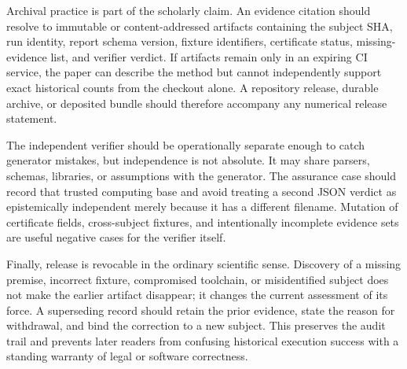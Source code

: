 Archival practice is part of the scholarly claim. An evidence citation should resolve to immutable or content-addressed artifacts containing the subject SHA, run identity, report schema version, fixture identifiers, certificate status, missing-evidence list, and verifier verdict. If artifacts remain only in an expiring CI service, the paper can describe the method but cannot independently support exact historical counts from the checkout alone. A repository release, durable archive, or deposited bundle should therefore accompany any numerical release statement.

The independent verifier should be operationally separate enough to catch generator mistakes, but independence is not absolute. It may share parsers, schemas, libraries, or assumptions with the generator. The assurance case should record that trusted computing base and avoid treating a second JSON verdict as epistemically independent merely because it has a different filename. Mutation of certificate fields, cross-subject fixtures, and intentionally incomplete evidence sets are useful negative cases for the verifier itself.

Finally, release is revocable in the ordinary scientific sense. Discovery of a missing premise, incorrect fixture, compromised toolchain, or misidentified subject does not make the earlier artifact disappear; it changes the current assessment of its force. A superseding record should retain the prior evidence, state the reason for withdrawal, and bind the correction to a new subject. This preserves the audit trail and prevents later readers from confusing historical execution success with a standing warranty of legal or software correctness.
